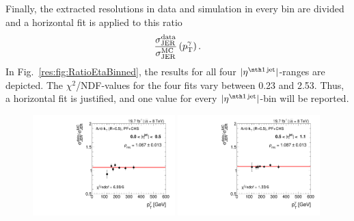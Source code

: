Finally, the extracted resolutions in data and simulation in every \ptgamma bin are divided and a horizontal fit is applied to this ratio
\begin{equation*}
\frac{\sigma_\mathrm{JER}^{\text{data}}}{\sigma_\mathrm{JER}^{\text{MC}}} \left( p_{\text{T}}^{\gamma} \right).
\end{equation*}
In Fig.~\ref{res:fig:RatioEtaBinned}, the results for all four $|\etafirstjet|$-ranges are depicted. 
The $\chi^2$/NDF-values for the four fits vary between 0.23 and 2.53. 
Thus, a horizontal fit is justified, and one value for every $|\etafirstjet|$-bin will be reported.

\begin{figure}[!t]
 \centering
    \includegraphics[width=0.49\textwidth]{figures/resolution/results/Ratio_Resolution_for_1_eta_bin_PFCHS_data_comparison_RMS99.pdf}
    \includegraphics[width=0.49\textwidth]{figures/resolution/results/Ratio_Resolution_for_2_eta_bin_PFCHS_data_comparison_RMS99.pdf}
    \vspace{18pt}


\end{figure}
